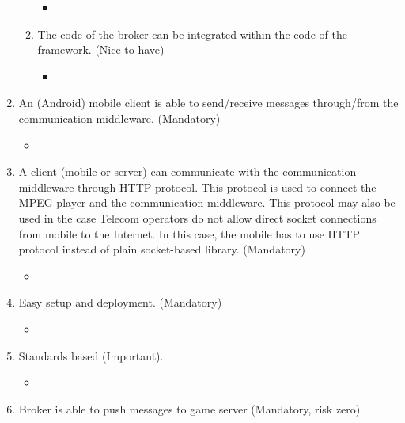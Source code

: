 \begin{enumerate}
\begin{enumerate}
\begin{itemize}
\item \donenocomment
\end{itemize}
\item The code of the broker can be integrated within the code of the
  framework. (Nice to have)
\label{R_6_b}
\begin{itemize}
\item \donenocomment
\end{itemize}
\end{enumerate}
\item An (Android) mobile client is able to send/receive messages
  through/from the communication middleware. (Mandatory)
\label{R_7}
\begin{itemize}
\item {}
\end{itemize}
\item A client (mobile or server) can communicate with the
  communication middleware through HTTP protocol. This protocol is
  used to connect the MPEG player and the communication
  middleware. This protocol may also be used in the case Telecom
  operators do not allow direct socket connections from mobile to the
  Internet. In this case, the mobile has to use HTTP protocol instead
  of plain socket-based library. (Mandatory)
\label{R_8}
\begin{itemize}
\item {}
\end{itemize}
\item Easy setup and deployment. (Mandatory)
\label{R_9}
\begin{itemize}
\item {}
\end{itemize}
\item Standards based (Important).
\label{R_10}
\begin{itemize}
\item {}
\end{itemize}
\item Broker is able to push messages to game server (Mandatory, risk
  zero)
\label{R_11}
\begin{itemize}

\end{itemize}
\end{enumerate}

